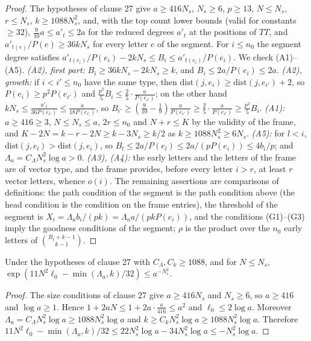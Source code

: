 \begin{proof}
The hypotheses of clause 27 give $a\ge416N_s$, $N_s\ge6$, $p\ge13$, $N\le N_s$, $r\le N_s$, $k\ge1088N_s^2$, and, with the top
count lower bounds (valid for constants $\ge32$), $\frac9{10}a\le a'_t\le2a$ for the reduced degrees $a'_t$ at the positions of
$TT$, and $a'_{t(e)}/P(e)\ge36kN_s$ for every letter $e$ of the segment. For $i\le n_0$ the segment degree satisfies
$a'_{t(e_i)}/P(e_i)-2kN_s\le B_i\le a'_{t(e_i)}/P(e_i)$. We check (A1)--(A5).
\emph{(A2), first part:} $B_i\ge36kN_s-2kN_s\ge k$, and $B_i\le2a/P(e_i)\le2a$.
\emph{(A2), growth:} if $i<i'\le n_0$ have the same type, then $\mathrm{dist}(j,e_i)\ge\mathrm{dist}(j,e_{i'})+2$, so
$P(e_i)\ge p^2P(e_{i'})$ and $\frac{p^2}5B_i\le\frac25\cdot\frac a{P(e_{i'})}$; on the other hand $kN_s\le
\frac{a'_t}{36P(e_{i'})}\le\frac a{18P(e_{i'})}$, so $B_{i'}\ge(\frac9{10}-\frac19)\frac a{P(e_{i'})}\ge\frac25\cdot\frac a{P(e_{i'})}\ge
\frac{p^2}5B_i$.
\emph{(A1):} $a\ge416\ge3$, $N\le N_s\le a$, $2r\le n_0$ and $N+r\le K$ by the validity of the frame, and
$K-2N=k-r-2N\ge k-3N_s\ge k/2$ as $k\ge1088N_s^2\ge6N_s$.
\emph{(A5):} for $l<i$, $\mathrm{dist}(j,e_l)>\mathrm{dist}(j,e_i)$, so $B_l\le2a/P(e_l)\le2a/(pP(e_i))\le4b_i/p$; and
$\Lambda_a=C_\Lambda N_s^2\log a>0$.
\emph{(A3), (A4):} the early letters and the letters of the frame are of vector type, and the frame provides, before every letter
$i>r$, at least $r$ vector letters, whence $o(i)$.
The remaining assertions are comparisons of definitions: the path condition of the segment is the path condition above
(the head condition is the condition on the frame entries), the threshold of the segment is
$X_i=\Lambda_ab_i/(pk)=\Lambda_aa/(pkP(e_i))$, and the conditions (G1)--(G3) imply the goodness conditions of the segment;
$\rho$ is the product over the $n_0$ early letters of $\binom{B_i+k-1}{k-1}$.
\end{proof}
\begin{lemma}\label{pf:linkG:finalnum}
Under the hypotheses of clause 27 with $C_\Lambda,C_k\ge1088$, and for $N\le N_s$,
$\exp(11N^2\ell_0-\min(\Lambda_a,k)/32)\le a^{-N_s^2}$.
\end{lemma}

\begin{proof}
The size conditions of clause 27 give $a\ge416N_s$ and $N_s\ge6$, so $a\ge416$ and $\log a\ge1$. Hence $1+2aN\le1+2a\cdot
\frac a{416}\le a^2$ and $\ell_0\le2\log a$. Moreover $\Lambda_a=C_\Lambda N_s^2\log a\ge1088N_s^2\log a$ and $k\ge C_kN_s^2\log a\ge
1088N_s^2\log a$. Therefore $11N^2\ell_0-\min(\Lambda_a,k)/32\le22N_s^2\log a-34N_s^2\log a\le-N_s^2\log a$.
\end{proof}

